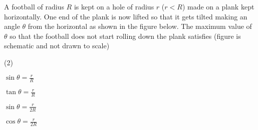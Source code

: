 \item A football of radius \(R\) is kept on a hole of radius \(r\) (\(r < R\)) made on a plank kept horizontally. One end of the plank is now lifted so that it gets tilted making an angle \(\theta\) from the horizontal as shown in the figure below. The maximum value of \(\theta\) so that the football does not start rolling down the plank satisfies (figure is schematic and not drawn to scale)
\begin{tasks}(2)
\item \(\sin \theta = \frac{r}{R}\)
\item \(\tan \theta = \frac{r}{R}\)
\item \(\sin \theta = \frac{r}{2R}\)
\item \(\cos \theta = \frac{r}{2R}\)
\end{tasks}
